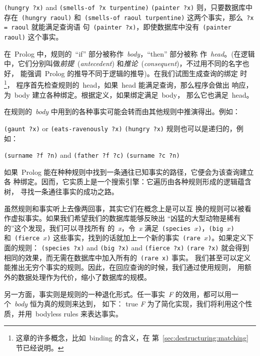 \prule
{\texttt{(hungry ?x)} and \texttt{(smells-of ?x turpentine)}}
{\texttt{(painter ?x)}}
则，只要数据库中存在~\texttt{(hungry raoul)} 和~\texttt{(smells-of raoul
  turpentine)} 这两个事实，那么~\texttt{?x = raoul} 就能满足查询语
句~\texttt{(painter ?x)}，即使数据库中没有~\texttt{(painter raoul)}
这个事实。

在~Prolog 中，规则的~``if'' 部分被称作~\emph{body}，``then'' 部分被称
作~\emph{head}。(在逻辑中，它们分别叫做\emph{前提}~(\emph{antecedent}) 和\emph{推论}~(\emph{consequent})，不过用不同的名字也好，
能强调~Prolog 的推导不同于逻辑的推导)。在我们试图生成查询的绑定
时\footnote{这章的许多概念，比如~binding 的含义，在
  第~\ref{sec:destructuring:matching} 节已经说明。}，
程序首先检查规则的~head，如果~head 能满足查询，那么程序会做出
响应，为~body 建立各种绑定。根据定义，如果绑定满足~body，
那么它也满足~head。

在规则的~\emph{body} 中用到的各种事实可能会转而由其他规则中推演得出。例如：

\prule
{\texttt{(gaunt ?x)} or \texttt{(eats-ravenously ?x)}}
{\texttt{(hungry ?x)}}
规则也可以是递归的，例如：

\prule
{\texttt{(surname ?f ?n)} and \texttt{(father ?f ?c)}}
{\texttt{(surname ?c ?n)}}

如果~Prolog 能在种种规则中找到一条通往已知事实的路径，它便会为该查询建立各
种绑定。因而，它实质上是一个搜索引擎：它遍历由各种规则形成的逻辑蕴含树，
寻找一条通往事实的成功之路。

虽然规则和事实听上去像两回事，其实它们在概念上是可以互
换的\pozhehao{}规则可以被看作虚拟事实。如果我们希望我们的数据库能够反映出
“凶猛的大型动物是稀有的”这个发现，我们可以寻找所有
的~\emph{x}，令~\emph{x} 满足~\texttt{(species $x$)}，\texttt{(big
  $x$)} 和~\texttt{(fierce $x$)} 这些事实，找到的话就加上一个新的事实~\texttt{(rare
  $x$)}。如果定义下面的规则：
\prule
{\texttt{(species ?x)} and \texttt{(big ?x)} and \texttt{(fierce ?x)}}
{\texttt{(rare ?x)}}
就会得到相同的效果，而无需在数据库中加入所有的~\texttt{(rare x)} 事实。
我们甚至可以定义能推出无穷个事实的规则。因此，在回应查询的时候，我们通过使用规则，
用额外的数据处理作为代价，缩小了数据库的规模。

另一方面，事实则是规则的一种退化形式。任一事实~\emph{F} 的效用，都可以用一个~\emph{body} 恒为真的规则来达到，
如下：
\prule
{true}
{\emph{F}}
为了简化实现，我们将利用这个性质，并用~bodyless rules 来表达事实。

